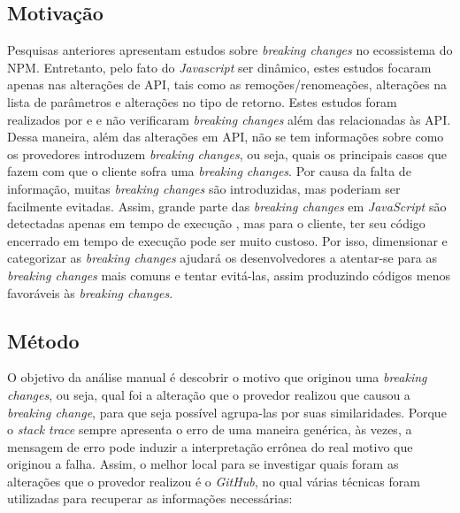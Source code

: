 \subsection{Motivação}
\label{mot:rq2}
Pesquisas anteriores apresentam estudos sobre \textit{breaking changes} no ecossistema do \gls{NPM}. Entretanto, pelo fato do \textit{Javascript} ser dinâmico, estes estudos focaram apenas nas alterações de \gls{API}, tais como as remoções/renomeações, alterações na lista de parâmetros e alterações no tipo de retorno. Estes estudos foram realizados por   e  e não verificaram \textit{breaking changes} além das relacionadas às \gls{API}. Dessa maneira, além das alterações em \gls{API}, não se tem informações sobre como os provedores introduzem \textit{breaking changes}, ou seja, quais os principais casos que fazem com que o cliente sofra uma \textit{breaking changes}. Por causa da falta de informação, muitas \textit{breaking changes} são introduzidas, mas poderiam ser facilmente evitadas. Assim, grande parte das \textit{breaking changes} em \textit{JavaScript} são detectadas apenas em tempo de execução \cite{noregrets2018}, mas para o cliente, ter seu código encerrado em tempo de execução pode ser muito custoso. Por isso, dimensionar e categorizar as \textit{breaking changes} ajudará os desenvolvedores a atentar-se para as \textit{breaking changes} mais comuns e tentar evitá-las, assim produzindo códigos menos favoráveis às \textit{breaking changes}.

\subsection{Método}
\label{apr:rq2}
O objetivo da análise manual é descobrir o motivo que originou uma \textit{breaking changes}, ou seja, qual foi a alteração que o provedor realizou que causou a \textit{breaking change}, para que seja possível agrupa-las por suas similaridades. Porque o \textit{stack trace} sempre apresenta o erro de uma maneira genérica, às vezes, a mensagem de erro pode induzir a interpretação errônea do real motivo que originou a falha. Assim, o melhor local para se investigar quais foram as alterações que o provedor realizou é o \textit{GitHub}, no qual várias técnicas foram utilizadas para recuperar as informações necessárias:

